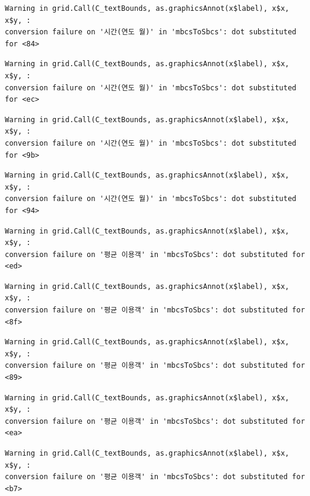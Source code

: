 \documentclass[
  letterpaper,
  DIV=11,
  numbers=noendperiod]{scrreprt}
\begin{document}
\begin{verbatim}
Warning in grid.Call(C_textBounds, as.graphicsAnnot(x$label), x$x, x$y, :
conversion failure on '시간(연도 월)' in 'mbcsToSbcs': dot substituted for <84>
\end{verbatim}

\begin{verbatim}
Warning in grid.Call(C_textBounds, as.graphicsAnnot(x$label), x$x, x$y, :
conversion failure on '시간(연도 월)' in 'mbcsToSbcs': dot substituted for <ec>
\end{verbatim}

\begin{verbatim}
Warning in grid.Call(C_textBounds, as.graphicsAnnot(x$label), x$x, x$y, :
conversion failure on '시간(연도 월)' in 'mbcsToSbcs': dot substituted for <9b>
\end{verbatim}

\begin{verbatim}
Warning in grid.Call(C_textBounds, as.graphicsAnnot(x$label), x$x, x$y, :
conversion failure on '시간(연도 월)' in 'mbcsToSbcs': dot substituted for <94>
\end{verbatim}

\begin{verbatim}
Warning in grid.Call(C_textBounds, as.graphicsAnnot(x$label), x$x, x$y, :
conversion failure on '평균 이용객' in 'mbcsToSbcs': dot substituted for <ed>
\end{verbatim}

\begin{verbatim}
Warning in grid.Call(C_textBounds, as.graphicsAnnot(x$label), x$x, x$y, :
conversion failure on '평균 이용객' in 'mbcsToSbcs': dot substituted for <8f>
\end{verbatim}

\begin{verbatim}
Warning in grid.Call(C_textBounds, as.graphicsAnnot(x$label), x$x, x$y, :
conversion failure on '평균 이용객' in 'mbcsToSbcs': dot substituted for <89>
\end{verbatim}

\begin{verbatim}
Warning in grid.Call(C_textBounds, as.graphicsAnnot(x$label), x$x, x$y, :
conversion failure on '평균 이용객' in 'mbcsToSbcs': dot substituted for <ea>
\end{verbatim}

\begin{verbatim}
Warning in grid.Call(C_textBounds, as.graphicsAnnot(x$label), x$x, x$y, :
conversion failure on '평균 이용객' in 'mbcsToSbcs': dot substituted for <b7>
\end{verbatim}
\end{document}
